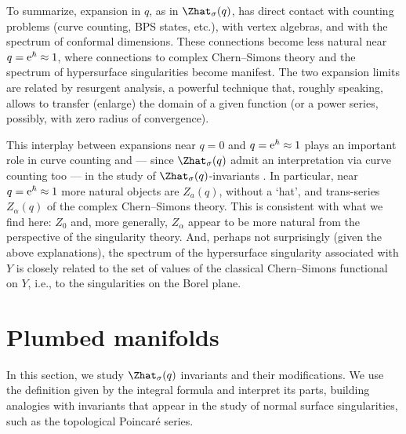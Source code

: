 \documentclass[pdftex]{sigma}
\begin{document}
To summarize, expansion in $q$, as in $\Zhat_{\sigma} (q)$, has direct contact with counting problems (curve counting, BPS states, etc.), with vertex algebras, and with the spectrum of conformal dimensions. These connections become less natural near $q = {\rm e}^{\hbar} \approx 1$, where connections to complex Chern--Simons theory and the spectrum of hypersurface singularities become manifest. The two expansion limits are related by resurgent analysis, a powerful technique that, roughly speaking, allows to transfer (enlarge) the domain of a given function (or a power series, possibly, with zero radius of convergence).

This interplay between expansions near $q = 0$ and $q = {\rm e}^{\hbar} \approx 1$ plays an important role in curve counting \cite{DT, GV, Katz, MNOP} and --- since $\Zhat_{\sigma} (q)$ admit an interpretation via curve counting too \cite{EGGKPSS22, EGGKPS22, GPPV20, GPV16} --- in the study of $\Zhat_{\sigma}(q)$-invariants \cite{AM22, Chun17, Chung20, GMP16,Wu20}. In particular, near $q = {\rm e}^{\hbar} \approx 1$ more natural objects are $Z_a (q)$, without a `hat', and trans-series $Z_{\alpha} (q)$ of the complex Chern--Simons theory. This is consistent with what we find here: $Z_0$ and, more generally, $Z_{\alpha}$ appear to be more natural from the perspective of the singularity theory. And, perhaps not surprisingly (given the above explanations), the spectrum of the hypersurface singularity associated with $Y$ is closely related to the set of values of the classical Chern--Simons functional on $Y$, i.e., to the singularities on the Borel plane.

\section{Plumbed manifolds}\label{sec:plumbing}

In this section, we study $\Zhat_{\sigma} (q)$ invariants and their modifications. We use the definition given by the integral formula \cite{GM21,GPPV20} and interpret its parts, building analogies with invariants that appear in the study of normal surface singularities, such as the topological Poincar\'e series.
\end{document}
